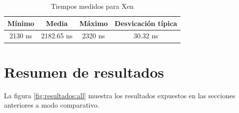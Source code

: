 \begin{table}[!ht]
  \centering
	\begin{tabular}{ |c|c|c|c| }
		\hline
    Mínimo          & Media      & Máximo  & Desvicación típica  \\
    \hline
    2130 ns         &  2182.65 ns     & 2320 ns    & 30.32 ns	   \\
    \hline
	\end{tabular}
	\caption{Tiempos medidos para Xen}
  \label{table:results_xen}
\end{table}

\section{Resumen de resultados}

La figura \ref{fig:resultados:all} muestra los resultados expuestos en las secciones anteriores a modo comparativo.\\

\mydatabig

\mydatadesv

